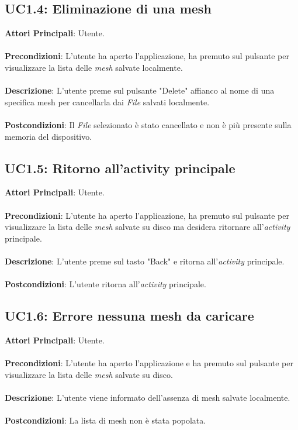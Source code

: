 \subsection{UC1.4: Eliminazione di una mesh}
\textbf{Attori Principali}: Utente.
\\\\ \textbf{Precondizioni}: L'utente ha aperto l'applicazione, ha premuto sul pulsante per visualizzare la lista delle \emph{mesh} salvate localmente.
\\\\ \textbf{Descrizione}: L'utente preme sul pulsante "Delete" affianco al nome di una specifica mesh per cancellarla dai \emph{File} salvati localmente.
\\\\ \textbf{Postcondizioni}: Il \emph{File} selezionato è stato cancellato e non è più presente sulla memoria del dispositivo.

\subsection{UC1.5: Ritorno all'activity principale}
\textbf{Attori Principali}: Utente.
\\\\ \textbf{Precondizioni}: L'utente ha aperto l'applicazione, ha premuto sul pulsante per visualizzare la lista delle \emph{mesh} salvate su disco ma desidera ritornare all'\emph{activity} principale.
\\\\ \textbf{Descrizione}: L'utente preme sul tasto "Back" e ritorna all'\emph{activity} principale.
\\\\ \textbf{Postcondizioni}: L'utente ritorna all'\emph{activity} principale.

\subsection{UC1.6: Errore nessuna mesh da caricare}
\textbf{Attori Principali}: Utente.
\\\\ \textbf{Precondizioni}: L'utente ha aperto l'applicazione e ha premuto sul pulsante per visualizzare la lista delle \emph{mesh} salvate su disco.
\\\\ \textbf{Descrizione}: L'utente viene informato dell'assenza di mesh salvate localmente.
\\\\ \textbf{Postcondizioni}: La lista di mesh non è stata popolata.


